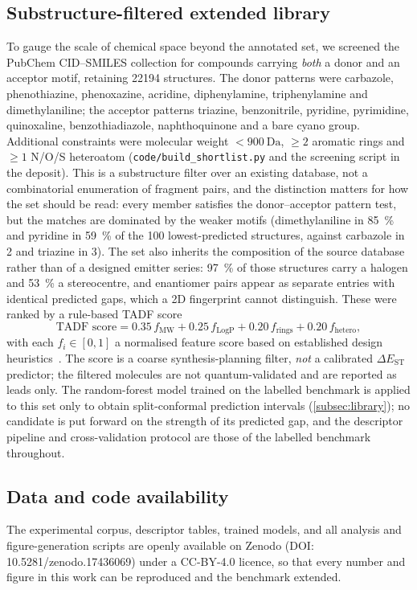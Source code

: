 \subsection{Substructure-filtered extended library}\label{sec:library_expansion}

To gauge the scale of chemical space beyond the annotated set, we screened the PubChem
CID--SMILES collection for compounds carrying \emph{both} a donor and an acceptor motif,
retaining \num{22194} structures. The donor patterns were carbazole, phenothiazine,
phenoxazine, acridine, diphenylamine, triphenylamine and dimethylaniline; the acceptor
patterns triazine, benzonitrile, pyridine, pyrimidine, quinoxaline, benzothiadiazole,
naphthoquinone and a bare cyano group. Additional constraints were molecular weight
$<\qty{900}{\dalton}$, $\geq 2$ aromatic rings and $\geq 1$ N/O/S heteroatom
(\texttt{code/build\_shortlist.py} and the screening script in the deposit).
This is a substructure filter over an existing database, not a combinatorial enumeration
of fragment pairs, and the distinction matters for how the set should be read: every
member satisfies the donor--acceptor pattern test, but the matches are dominated by the
weaker motifs (dimethylaniline in \qty{85}{\percent} and pyridine in \qty{59}{\percent}
of the \num{100} lowest-predicted structures, against carbazole in \num{2} and triazine
in \num{3}). The set also inherits the composition of the source database rather than of
a designed emitter series: \qty{97}{\percent} of those structures carry a halogen and
\qty{53}{\percent} a stereocentre, and enantiomer pairs appear as separate entries with
identical predicted gaps, which a 2D fingerprint cannot distinguish. These were ranked by a rule-based TADF score
\begin{equation}
  \text{TADF score} = 0.35\,f_\text{MW} + 0.25\,f_\text{LogP} + 0.20\,f_\text{rings} + 0.20\,f_\text{hetero},
  \label{eq:tadf_score}
\end{equation}
with each $f_i\in[0,1]$ a normalised feature score based on established design
heuristics~\cite{Liu2012,Uoyama2012,Wong2017}. The score is a coarse
synthesis-planning filter, \emph{not} a calibrated $\Delta E_\text{ST}$ predictor;
the filtered molecules are not quantum-validated and are reported as leads only.
The random-forest model trained on the labelled benchmark is applied to this set only to
obtain split-conformal prediction intervals (\cref{subsec:library}); no candidate is put
forward on the strength of its predicted gap, and the descriptor pipeline and
cross-validation protocol are those of the labelled benchmark throughout.

\subsection{Data and code availability}

The experimental corpus, descriptor tables, trained models, and all analysis and
figure-generation scripts are openly available on Zenodo
(DOI: 10.5281/zenodo.17436069) under a CC-BY-4.0 licence, so that every number and
figure in this work can be reproduced and the benchmark extended.
